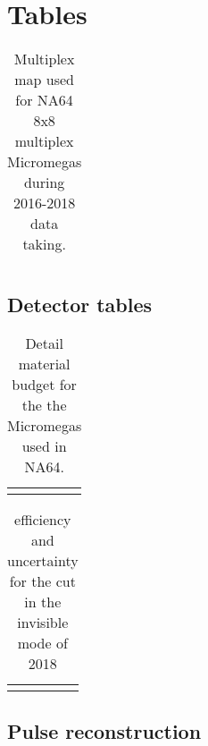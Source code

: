 
\chapter{Tables} %

\label{AppendixF} %

\begin{table}[h!]
  \centering
  \begin{tabular}{|r|l|}
  \end{tabular}
  \caption[original Multiplex map]{Multiplex map used for NA64 8x8 \mms multiplex Micromegas during 2016-2018 data taking.}
  \label{tab:mm-map-original}
\end{table}

\section{Detector tables}
\label{appF:detector-tables}

\begin{table}[bth!]
\centering
\begin{tabular}{|l|c|c|}
&&
\end{tabular}
\caption[material budget MM]{Detail material budget for the the Micromegas used in NA64.}
\label{tab:mm-mbudget}
\end{table}

\begin{table}[bth!]
  \centering
  \begin{tabular}{|lrr|}
    &&
  \end{tabular}
  \caption[efficiency cuts invisible mode]{efficiency and uncertainty for the cut in the invisible mode of 2018}
  \label{tab:inv-cut-eff}
\end{table}

\section{Pulse reconstruction}
\label{ch3:sec:pulse-reconstruction}


